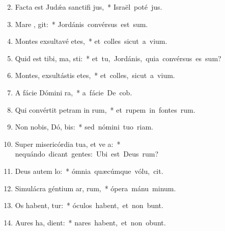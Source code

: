 \begin{flushleft}
\begin{enumerate}[leftmargin=*]
\setcounter{enumi}{1}


\item Facta est Jud\'{\ae}a sanctifi jus,~* \mbox{Israël poté jus.}
\item Mare ,  git:~* \mbox{Jordánis convérsus est sum.}
\item Montes exsultavé  etes,~* \mbox{et colles sicut a vium.}
\item Quid est tibi, ma,  sti:~* \mbox{et tu, Jordánis, quia convérsus es sum?}
\item Montes, exsultástis  etes,~* \mbox{et colles, sicut a vium.}
\item A fácie Dómini   ra,~* \mbox{a fácie De cob.}
\item Qui convértit petram in  rum,~* \mbox{et rupem in fontes rum.}
\item Non nobis, Dó,  bis:~* \mbox{sed nómini tuo  riam.}
\item Super misericórdia tua, et ve a:~* \mbox{nequándo dicant gentes: Ubi est Deus rum?}
\item Deus autem   lo:~* \mbox{ómnia quæcúmque vólu, cit.}
\item Simulácra géntium ar,  rum,~* \mbox{ópera mánu minum.}
\item Os habent,   tur:~* \mbox{óculos habent, et non bunt.}
\item Aures ha,   dient:~* \mbox{nares habent, et non obunt.}

\end{enumerate}
\end{flushleft}
